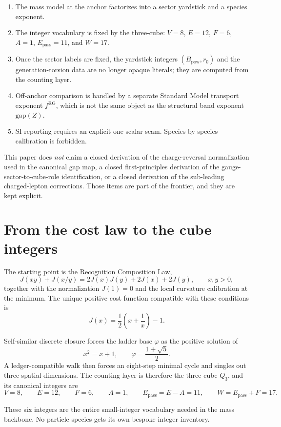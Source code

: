 \documentclass[11pt]{article}
\newcommand{\phig}{\varphi}
\newcommand{\Epass}{E_{\mathrm{pass}}}
\newcommand{\Bpow}{B_{\mathrm{pow}}}
\begin{document}
\begin{enumerate}
  \item The mass model at the anchor factorizes into a sector yardstick and a species exponent.
  \item The integer vocabulary is fixed by the three-cube: \(V=8\), \(E=12\), \(F=6\), \(A=1\), \(\Epass=11\), and \(W=17\).
  \item Once the sector labels are fixed, the yardstick integers \((\Bpow,r_0)\) and the generation-torsion data are no longer opaque literals; they are computed from the counting layer.
  \item Off-anchor comparison is handled by a separate Standard Model transport exponent \(f^{\mathrm{RG}}\), which is not the same object as the structural band exponent \(\mathrm{gap}(Z)\).
  \item SI reporting requires an explicit one-scalar seam. Species-by-species calibration is forbidden.
\end{enumerate}

This paper does \emph{not} claim a closed derivation of the charge-reversal normalization used in the canonical gap map, a closed first-principles derivation of the gauge-sector-to-cube-role identification, or a closed derivation of the sub-leading charged-lepton corrections. Those items are part of the frontier, and they are kept explicit.

\section{From the cost law to the cube integers}

The starting point is the Recognition Composition Law,
\[
  J(xy) + J(x/y) = 2J(x)J(y) + 2J(x) + 2J(y),
  \qquad x,y>0,
\]
together with the normalization \(J(1)=0\) and the local curvature calibration at the minimum. The unique positive cost function compatible with these conditions is
\[
  J(x) = \frac{1}{2}\left(x + \frac{1}{x}\right) - 1.
\]

Self-similar discrete closure forces the ladder base \(\phig\) as the positive solution of
\[
  x^2 = x + 1,
  \qquad
  \phig = \frac{1+\sqrt{5}}{2}.
\]
A ledger-compatible walk then forces an eight-step minimal cycle and singles out three spatial dimensions. The counting layer is therefore the three-cube \(Q_3\), and its canonical integers are
\[
  V=8,
  \qquad
  E=12,
  \qquad
  F=6,
  \qquad
  A=1,
  \qquad
  \Epass = E-A = 11,
  \qquad
  W = \Epass + F = 17.
\]

These six integers are the entire small-integer vocabulary needed in the mass backbone. No particle species gets its own bespoke integer inventory.
\end{document}

